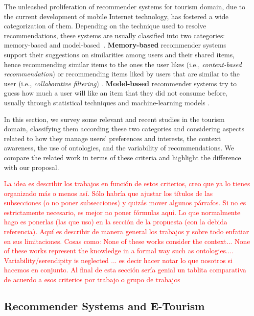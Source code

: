 The unleashed proliferation  of recommender systems for tourism domain, due to the current development of mobile Internet technology, has fostered a wide categorization of them. 
Depending on the technique used to resolve recommendations, these systems are usually classified into two categories: memory-based and model-based~\cite{bobadilla2013recommender,sun2019building}. \textbf{Memory-based} recommender systems support their  suggestions on similarities among users and their shared items, hence recommending similar items to the ones the user likes (i.e., \textit{content-based recommendation}) or recommending items liked by users that are similar to the user (i.e., \textit{collaborative filtering}) \cite{ebrahim_2012}. \textbf{Model-based} recommender systems try to guess how much a user will like an item that they did not consume before, usually through statistical techniques and machine-learning models \cite{ebrahim_2012}. 

In this section, we survey some relevant and recent studies in the tourism domain, classifying them according these two categories and considering aspects related to  how they manage users' preferences and interests, the context awareness, the use of ontologies, and the variability of recommendations. We compare the related work in terms of these criteria and highlight the difference with our proposal.    

\textcolor{red}{La idea es describir los trabajos en función de estos criterios, creo que ya lo tienes organizado más o menos así. Sólo habría que ajustar los títulos de las subsecciones (o no poner subsecciones) y quizás mover algunos párrafos. Si no es estrictamente necesario, es mejor no poner fórmulas aquí. Lo que normalmente hago es ponerlas (las que uso) en la sección de la propuesta (con la debida referencia). Aquí es describir de manera general los trabajos y sobre todo enfatiar en sus limitaciones. Cosas como: None of these works consider the context... None of these works represent the knowledge in a formal way such as ontologies.... Variability/serendipity  is neglected ... es decir hacer notar lo que nosotros si hacemos en conjunto. Al final de esta sección sería genial un tablita comparativa de acuerdo a esos criterios por trabajo o grupo de trabajos}

\subsection{Recommender Systems and E-Tourism} \label{section:recommender-systems}

